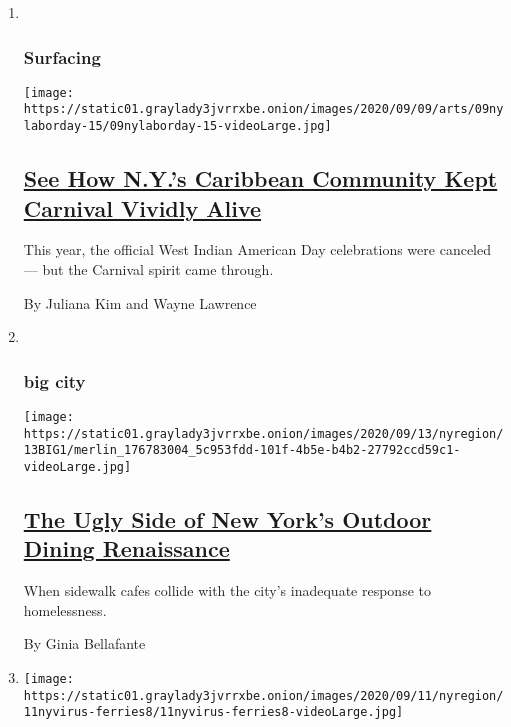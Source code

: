 \begin{enumerate}
\def\labelenumi{\arabic{enumi}.}
\item ~
  \hypertarget{surfacing}{%
  \subsubsection{Surfacing}\label{surfacing}}

  \texttt{[image: https://static01.graylady3jvrrxbe.onion/images/2020/09/09/arts/09nylaborday-15/09nylaborday-15-videoLarge.jpg]}

  \hypertarget{see-how-nys-caribbean-community-kept-carnival-vividly-alive}{%
  \subsection{\texorpdfstring{\href{/2020/09/11/nyregion/west-indian-carnival-parade.html}{See
  How N.Y.'s Caribbean Community Kept Carnival Vividly
  Alive}}{See How N.Y.'s Caribbean Community Kept Carnival Vividly Alive}}\label{see-how-nys-caribbean-community-kept-carnival-vividly-alive}}

  This year, the official West Indian American Day celebrations were
  canceled --- but the Carnival spirit came through.

  By Juliana Kim and Wayne Lawrence
\item ~
  \hypertarget{big-city}{%
  \subsubsection{big city}\label{big-city}}

  \texttt{[image: https://static01.graylady3jvrrxbe.onion/images/2020/09/13/nyregion/13BIG1/merlin\_176783004\_5c953fdd-101f-4b5e-b4b2-27792ccd59c1-videoLarge.jpg]}

  \hypertarget{the-ugly-side-of-new-yorks-outdoor-dining-renaissance}{%
  \subsection{\texorpdfstring{\href{/2020/09/10/nyregion/nyc-outdoor-dining-homeless.html}{The
  Ugly Side of New York's Outdoor Dining
  Renaissance}}{The Ugly Side of New York's Outdoor Dining Renaissance}}\label{the-ugly-side-of-new-yorks-outdoor-dining-renaissance}}

  When sidewalk cafes collide with the city's inadequate response to
  homelessness.

  By Ginia Bellafante
\item
  \texttt{[image: https://static01.graylady3jvrrxbe.onion/images/2020/09/11/nyregion/11nyvirus-ferries8/11nyvirus-ferries8-videoLarge.jpg]}


\end{enumerate}
